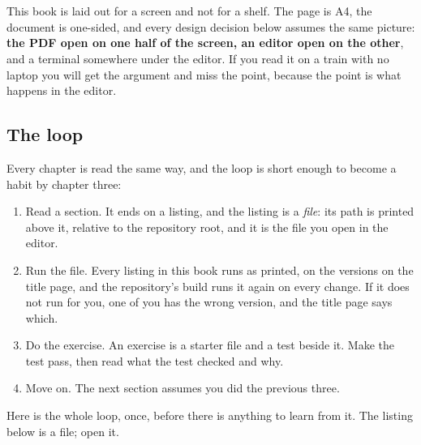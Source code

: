 \chapter*{\lblHowToUse}
{}
\markboth{\lblHowToUse}{\lblHowToUse}

\noindent
This book is laid out for a screen and not for a shelf. The page is A4, the
document is one-sided, and every design decision below assumes the same
picture: \textbf{the PDF open on one half of the screen, an editor open on the
other}, and a terminal somewhere under the editor. If you read it on a train
with no laptop you will get the argument and miss the point, because the point
is what happens in the editor.

\section*{The loop}

Every chapter is read the same way, and the loop is short enough to become a
habit by chapter three:

\begin{enumerate}[leftmargin=1.6em, itemsep=3pt]
  \item Read a section. It ends on a listing, and the listing is a
        \emph{file}: its path is printed above it, relative to the repository
        root, and it is the file you open in the editor.
  \item Run the file. Every listing in this book runs as printed, on the
        versions on the title page, and the repository's build runs it again on
        every change. If it does not run for you, one of you has the wrong
        version, and the title page says which.
  \item Do the exercise. An exercise is a starter file and a test beside it.
        Make the test pass, then read what the test checked and why.
  \item Move on. The next section assumes you did the previous three.
\end{enumerate}

\noindent
{}

Here is the whole loop, once, before there is anything to learn from it. The
listing below is a file; open it.


